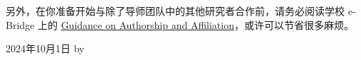 \vspace{\baselineskip}

另外，在你准备开始与除了导师团队中的其他研究者合作前，请务必阅读学校 e-Bridge 上的 \href{https://ebridge.xjtlu.edu.cn/urd/sits.urd/run/SIW_FILE_LOAD.start_url?08F2CBCAE3174A7365Px9_5kBfG0_iGiWj8zb7ybwaO0YBYc8NiKlPG93xyQA9X2SClXOLLd7-_EgF50aijROwT-rdSGIUIbRRzhFu-76Ha0g2HymUr0S-Fgjm1DXP9RO1GhGzx5-akgsDSMBlNhR7vpib85F9vlqa67My7RKHFSiluZueFy52YCBtintt0wDTKmx4fCjkWnldNDaxo6ZVD2L572Us3V-FOv485wYZUNUn5NLzgR0pAaU7aiKnTVJY8Aa2su5F4u7o-rNPJPety3jwwJ4O1v1agpDZLZ1it1H5fWn3IgLNaWlUh84YpxNRXyTW1kIwrX0r4-dT1eoxdZUAFrJhaBwz6E0w}{Guidance on Authorship and Affiliation}，或许可以节省很多麻烦。

\begin{flushright}
    2024年10月1日 by \Shiyao
\end{flushright}
